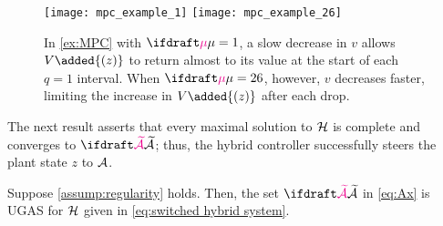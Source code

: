 \begin{figure*}[t]
    \centering
    {\texttt{[image: mpc\_example\_1]}}
    {\texttt{[image: mpc\_example\_26]}}
    \setlength{\belowcaptionskip}{-12pt}
    \caption{In \cref{ex:MPC} with $\vdiffcoeff = 1$,
    a slow decrease in $v$ allows $V\added{(z)}$ to return almost to 
    its value at the start of each $q = 1$ interval. When $\vdiffcoeff=26$, however, 
    $v$ decreases faster, limiting the increase in $V\added{(z)}$
    after each drop.}
    \label{fig:mpc example}
\end{figure*}

The next result asserts that every maximal solution to ${\mathcal{H}}$
is complete and converges to $\calAX$; thus, the hybrid controller 
successfully steers the plant state $z$ to ${\mathcal{A}}$.
\begin{theorem}
    Suppose \cref{assump:regularity} holds. 
    Then, the set $\calAX$ in \cref{eq:Ax} is UGAS 
    for ${\mathcal{H}}$ given in \cref{eq:switched hybrid system}.
    \label{the:UGAS}
\end{theorem}

